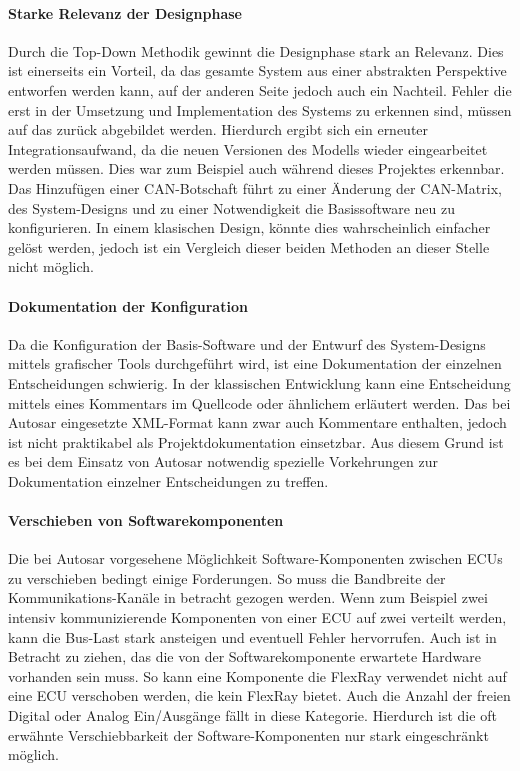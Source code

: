 \documentclass[
  a4paper,					    %
  twoside,
  DIV=calc,     				%
  bibliography=totoc,
  cleardoublepage=empty,
  ngerman,     					%
  final       					%
]{scrbook}
\begin{document}
\paragraph{Starke Relevanz der Designphase}
Durch die Top-Down Methodik gewinnt die Designphase stark an Relevanz. Dies ist einerseits ein Vorteil, da das gesamte System aus einer abstrakten Perspektive entworfen werden kann, auf der anderen Seite jedoch auch ein Nachteil. Fehler die erst in der Umsetzung und Implementation des Systems zu erkennen sind, müssen auf das zurück abgebildet werden. Hierdurch ergibt sich ein erneuter Integrationsaufwand, da die neuen Versionen des Modells wieder eingearbeitet werden müssen. Dies war zum Beispiel auch während dieses Projektes erkennbar. Das Hinzufügen einer CAN-Botschaft führt zu einer Änderung der CAN-Matrix, des System-Designs und zu einer Notwendigkeit die Basissoftware neu zu konfigurieren. In einem klasischen Design, könnte dies wahrscheinlich einfacher gelöst werden, jedoch ist ein Vergleich dieser beiden Methoden an dieser Stelle nicht möglich.

\paragraph{Dokumentation der Konfiguration}
Da die Konfiguration der Basis-Software und der Entwurf des System-Designs mittels grafischer Tools durchgeführt wird, ist eine Dokumentation der einzelnen Entscheidungen schwierig.\cite[Seite 182 f.]{SE_Autosar} In der klassischen Entwicklung kann eine Entscheidung mittels eines Kommentars im Quellcode oder ähnlichem erläutert werden. Das bei Autosar eingesetzte XML-Format kann zwar auch Kommentare enthalten, jedoch ist nicht praktikabel als Projektdokumentation einsetzbar. Aus diesem Grund ist es bei dem Einsatz von Autosar notwendig spezielle Vorkehrungen zur Dokumentation einzelner Entscheidungen zu treffen. 

\paragraph{Verschieben von Softwarekomponenten}
Die bei Autosar vorgesehene Möglichkeit Software-Komponenten zwischen ECUs zu verschieben bedingt einige Forderungen. So muss die Bandbreite der Kommunikations-Kanäle in betracht gezogen werden. Wenn zum Beispiel zwei intensiv kommunizierende Komponenten von einer ECU auf zwei verteilt werden, kann die Bus-Last stark ansteigen und eventuell Fehler hervorrufen. Auch ist in Betracht zu ziehen, das die von der Softwarekomponente erwartete Hardware vorhanden sein muss. So kann eine Komponente die FlexRay verwendet nicht auf eine ECU verschoben werden, die kein FlexRay bietet. Auch die Anzahl der freien Digital oder Analog Ein/Ausgänge fällt in diese Kategorie. Hierdurch ist die oft erwähnte Verschiebbarkeit der Software-Komponenten nur stark eingeschränkt möglich.
\end{document}
